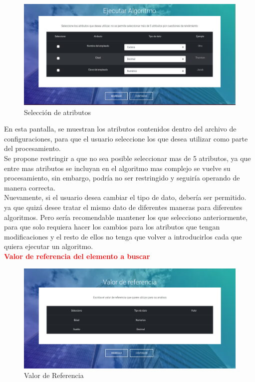 \begin{figure}[H]
	\hypertarget{fig:red}{\hspace{1pt}}
	\begin{center}
		\includegraphics[width=1\textwidth]{capitulo7/images/ejecutar2.png}
		\caption{Selección de atributos}
		\label{fig:seleccioneatr}
	\end{center}
\end{figure}
En esta pantalla, se muestran los atributos contenidos dentro del archivo de configuraciones, para que el usuario seleccione los que desea utilizar como parte del procesamiento. \\
Se propone restringir a que no sea posible seleccionar mas de 5 atributos, ya que entre mas atributos se incluyan en el algoritmo mas complejo se vuelve su procesamiento, sin embargo, podría no ser restringido y seguiría operando de manera correcta.\\
Nuevamente, si el usuario desea cambiar el tipo de dato, debería ser permitido. ya que quizá desee tratar el mismo dato de diferentes maneras para diferentes algoritmos. Pero sería recomendable mantener los que selecciono anteriormente, para que solo requiera hacer los cambios para los atributos que tengan modificaciones y el resto de ellos no tenga que volver a introducirlos cada que quiera ejecutar un algoritmo.\\
\newpage
\textbf{\textcolor{red}{Valor de referencia del elemento a buscar}}
\begin{figure}[H]
	\hypertarget{fig:red}{\hspace{1pt}}
	\begin{center}
		\includegraphics[width=1\textwidth]{capitulo7/images/referencia.png}
		\caption{Valor de Referencia}
		\label{fig:ref}
	\end{center}
\end{figure}
